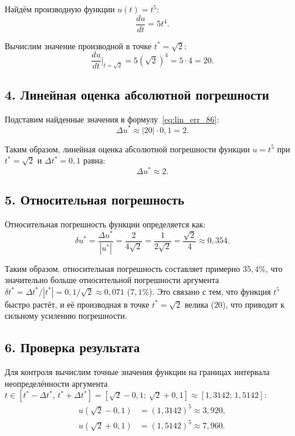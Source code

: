 \documentclass{article}
\begin{document}
Найдём производную функции $u(t) = t^5$:
\begin{equation}
\frac{du}{dt} = 5t^4.
\end{equation}

Вычислим значение производной в точке $t^* = \sqrt{2}$:
\begin{equation}
\frac{du}{dt}\bigg|_{t = \sqrt{2}} = 5(\sqrt{2})^4 = 5 \cdot 4 = 20.
\end{equation}

\subsection*{4. Линейная оценка абсолютной погрешности}

Подставим найденные значения в формулу~\eqref{eq:lin_err_86}:
\begin{equation}
\Delta u^* \approx |20| \cdot 0{,}1 = 2.
\end{equation}

Таким образом, линейная оценка абсолютной погрешности функции $u = t^5$ при $t^* = \sqrt{2}$ и $\Delta t^* = 0{,}1$ равна:
\begin{equation}
\boxed{\Delta u^* \approx 2.}
\end{equation}

\subsection*{5. Относительная погрешность}

Относительная погрешность функции определяется как:
\begin{equation}
\delta u^* = \frac{\Delta u^*}{|u^*|} = \frac{2}{4\sqrt{2}} = \frac{1}{2\sqrt{2}} = \frac{\sqrt{2}}{4} \approx 0{,}354.
\end{equation}

Таким образом, относительная погрешность составляет примерно $35{,}4\%$, что значительно больше относительной погрешности аргумента $\delta t^* = \Delta t^*/|t^*| = 0{,}1/\sqrt{2} \approx 0{,}071$ ($7{,}1\%$). Это связано с тем, что функция $t^5$ быстро растёт, и её производная в точке $t^* = \sqrt{2}$ велика ($20$), что приводит к сильному усилению погрешности.

\subsection*{6. Проверка результата}

Для контроля вычислим точные значения функции на границах интервала 
неопределённости аргумента $t \in [t^* - \Delta t^*,\, t^* + \Delta t^*] 
= [\sqrt{2} - 0{,}1;\, \sqrt{2} + 0{,}1] \approx [1{,}3142;\, 1{,}5142]$:
\begin{align}
u(\sqrt{2} - 0{,}1) &= (1{,}3142)^5 \approx 3{,}920, \\
u(\sqrt{2} + 0{,}1) &= (1{,}5142)^5 \approx 7{,}960.
\end{align}
\end{document}

